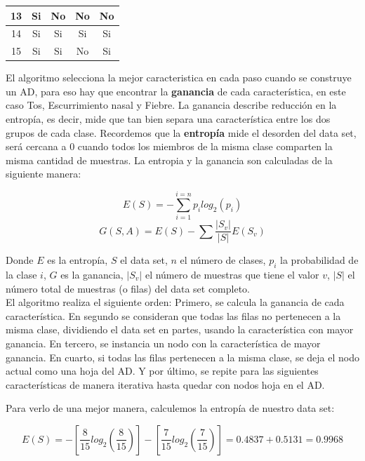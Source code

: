\documentclass[twoside,spanish,ESP,MSc]{plantillaLabUPV}
\theoremstyle{definition}
\begin{document}
\begin{table}[h]
\begin{tabular}{|c|c|c|c|c|}
		13          & Si           & No                                                                     & No              & No             \\ \hline
		14          & Si           & Si                                                                     & Si              & Si             \\ \hline
		15          & Si           & Si                                                                     & No              & Si             \\ \hline
	\end{tabular}
\end{table}

El algoritmo selecciona la mejor caracteristica en cada paso cuando se construye un AD, para eso hay que encontrar la \textbf{ganancia} de cada característica, en este caso Tos, Escurrimiento nasal y Fiebre. La ganancia describe reducción en la entropía, es decir, mide que tan bien separa una característica entre los dos grupos de cada clase. Recordemos que la \textbf{entropía} mide el desorden del data set, será cercana a 0 cuando todos los miembros de la misma clase comparten la misma cantidad de muestras. La entropia y la ganancia son calculadas de la siguiente manera:

 $$E(S) = -\sum_{i=1}^{i=n} p_i log_{2}(p_i)$$
 $$G(S,A)= E(S) - \sum\frac{|S_v|}{|S|} E(S_v)$$
 
 Donde $E$ es la entropía, $S$ el data set, $n$ el número de clases, $p_i$ la probabilidad de la clase $i$, $G$ es la ganancia, $|S_v|$ el número de muestras que tiene el valor $v$, $|S|$ el número total de muestras (o filas) del data set completo.\\
 
 El algoritmo realiza el siguiente orden: Primero, se calcula la ganancia de cada característica. En segundo se consideran que todas las filas no pertenecen a la misma clase, dividiendo el data set en partes, usando la característica con mayor ganancia. En tercero, se instancia un nodo con la característica de mayor ganancia. En cuarto, si todas las filas pertenecen a la misma clase, se deja el nodo actual como una hoja del AD. Y por último, se repite para las siguientes características de manera iterativa hasta quedar con nodos hoja en el AD.
 
 Para verlo de una mejor manera, calculemos la entropía de nuestro data set:
 
  $$E(S) = - \left[\frac{8}{15} log_{2}\left(\frac{8}{15}\right)\right] - \left[\frac{7}{15} log_{2}\left(\frac{7}{15}\right)\right] = 0.4837 + 0.5131 = 0.9968$$
 
\end{document}
